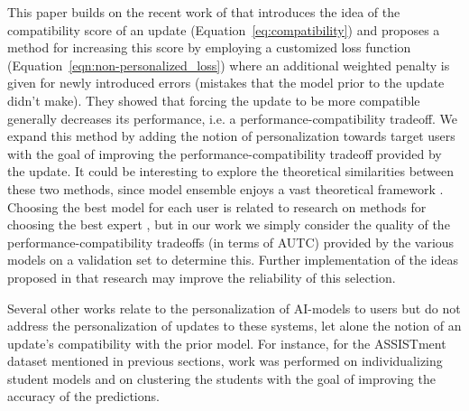 \documentclass[letterpaper]{article} %
\theoremstyle{definition}
\begin{document}
This paper builds on the recent work of \citet{bansal2019updates} that introduces the idea of the compatibility score of an update (Equation~\ref{eq:compatibility}) and proposes a method for increasing this score by employing a customized loss function (Equation~\ref{eqn:non-personalized_loss}) where an additional weighted penalty is given for newly introduced errors (mistakes that the model prior to the update didn't make). They showed that forcing the update to be more compatible generally decreases its performance, i.e. a performance-compatibility tradeoff. We expand this method by adding the notion of personalization towards target users with the goal of improving the performance-compatibility tradeoff provided by the update. %
It could be interesting to explore the theoretical similarities between these two methods, since model ensemble enjoys a vast theoretical framework \cite{freund1996experiments}.  Choosing the best model for each user is related to research on methods for choosing the best expert \cite{herbster1998tracking}, but in our work we simply consider the quality of the performance-compatibility tradeoffs (in terms of AUTC) provided by the various models on a validation set to determine this.
Further implementation of the ideas proposed in that research may improve the reliability of this selection.

Several other works relate to the personalization of AI-models to users but do not address the personalization of updates to these systems, let alone the notion of an update's compatibility with the prior model. For instance, for the ASSISTment dataset mentioned in previous sections, work was performed on individualizing student models  \cite{wang2012student,pardos2010modeling} and on clustering the students \cite{trivedi2011clustering,trivedi2010spectral} with the goal of improving the accuracy of the predictions.
\end{document}
